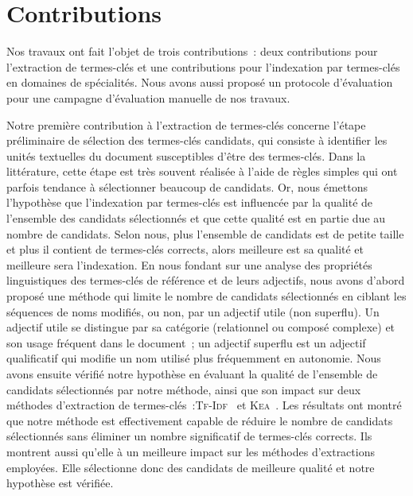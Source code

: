   \section{Contributions}
  \label{sec:main-conclusion-contributions}
    Nos travaux ont fait l'objet de trois contributions~: deux contributions
    pour l'extraction de termes-clés et une contributions pour l'indexation par
    termes-clés en domaines de spécialités. Nous avons aussi proposé un
    protocole d'évaluation pour une campagne d'évaluation manuelle de nos
    travaux.

    Notre première contribution à l'extraction de termes-clés concerne l'étape
    préliminaire de sélection des termes-clés candidats, qui consiste à
    identifier les unités textuelles du document susceptibles d'être des
    termes-clés. Dans la littérature, cette étape est très souvent réalisée à
    l'aide de règles simples qui ont parfois tendance à sélectionner beaucoup de
    candidats. Or, nous émettons l'hypothèse que l'indexation par termes-clés
    est influencée par la qualité de l'ensemble des candidats sélectionnés et
    que cette qualité est en partie due au nombre de candidats. Selon nous, plus
    l'ensemble de candidats est de petite taille et plus il contient de
    termes-clés corrects, alors meilleure est sa qualité et meilleure sera
    l'indexation.
    En nous fondant sur une analyse des propriétés linguistiques des termes-clés
    de référence et de leurs adjectifs, nous avons d'abord proposé une méthode
    qui limite le nombre de candidats sélectionnés en ciblant les séquences de
    noms modifiés, ou non, par un adjectif utile (non superflu). Un adjectif
    utile se distingue par sa catégorie (relationnel ou composé complexe) et son
    usage fréquent dans le document~; un adjectif superflu est un adjectif
    qualificatif qui modifie un nom utilisé plus fréquemment en autonomie.
    Nous avons ensuite vérifié notre hypothèse en évaluant la qualité de
    l'ensemble de candidats sélectionnés par notre méthode, ainsi que son impact
    sur deux méthodes d'extraction de
    termes-clés~:\textsc{Tf-Idf}~\cite{jones1972tfidf} et
    \textsc{Kea}~\cite{witten1999kea}. Les résultats ont montré que notre
    méthode est effectivement capable de réduire le nombre de candidats
    sélectionnés sans éliminer un nombre significatif de termes-clés corrects.
    Ils montrent aussi qu'elle à un meilleure impact sur les méthodes
    d'extractions employées. Elle sélectionne donc des candidats de meilleure
    qualité et notre hypothèse est vérifiée.

